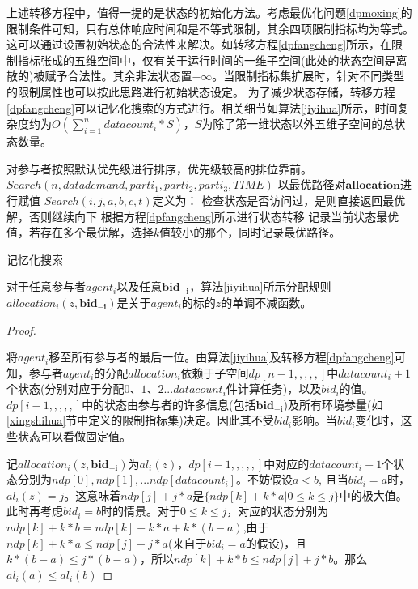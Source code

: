 \documentclass[promaster]{thesis-uestc}
\begin{document}
上述转移方程中，值得一提的是状态的初始化方法。考虑最优化问题\ref{dpmoxing}的限制条件可知，只有总体响应时间和是不等式限制，其余四项限制指标均为等式。这可以通过设置初始状态的合法性来解决。如转移方程\ref{dpfangcheng}所示，在限制指标张成的五维空间中，仅有关于运行时间的一维子空间(此处的状态空间是离散的)被赋予合法性。其余非法状态置$-\infty$。当限制指标集扩展时，针对不同类型的限制属性也可以按此思路进行初始状态设定。
为了减少状态存储，转移方程\ref{dpfangcheng}可以记忆化搜索的方式进行。相关细节如算法\ref{jiyihua}所示，时间复杂度约为$O(\sum_{i=1}^{n}{datacount_i}*S)$，$S$为除了第一维状态以外五维子空间的总状态数量。

\begin{algorithm}[H]
    对参与者按照默认优先级进行排序，优先级较高的排位靠前。
    $Search(n,datademand,parti_1,parti_2,parti_3,TIME)$\;
    以最优路径对$\mathbf{allocation}$进行赋值\;
    \;
    $Search(i,j,a,b,c,t)$定义为：\;
    检查状态是否访问过，是则直接返回最优解，否则继续向下\;
    根据方程\ref{dpfangcheng}所示进行状态转移\;
    记录当前状态最优值，若存在多个最优解，选择$k$值较小的那个，同时记录最优路径。\;
\caption{记忆化搜索}
\label{jiyihua}
\end{algorithm}

\begin{theorem}
对于任意参与者$agent_i$以及任意$\mathbf{bid_{-i}}$，算法\ref{jiyihua}所示分配规则$allocation_i(z,\mathbf{bid_{-i}})$是关于$agent_i$的标的$z$的单调不减函数。
\end{theorem}

\begin{proof}

\label{dpdandiao}

将$agent_i$移至所有参与者的最后一位。由算法\ref{jiyihua}及转移方程\ref{dpfangcheng}可知，参与者$agent_i$的分配$allocation_i$依赖于子空间$dp[n-1,,,,,]$中$datacount_i+1$个状态(分别对应于分配$0、1、2...datacount_i$件计算任务)，以及$bid_i$的值。$dp[i-1,,,,,]$中的状态由参与者的许多信息(包括$\mathbf{bid_{-i}}$)及所有环境参量(如\ref{xingshihua}节中定义的限制指标集)决定。因此其不受$bid_i$影响。当$bid_i$变化时，这些状态可以看做固定值。

记$allocation_i(z,\mathbf{bid_{-i}})$为$al_i(z)$，$dp[i-1,,,,,]$中对应的$datacount_i+1$个状态分别为$ndp[0],ndp[1],...ndp[datacount_i]$。不妨假设$a < b$, 且当$bid_i = a$时，$al_i(z) = j$。这意味着$ndp[j]+j*a$是$\{ndp[k] + k*a|0 \leq k \leq j\}$中的极大值。此时再考虑$bid_i=b$时的情景。对于$ 0\leq k\leq j$，对应的状态分别为$ndp[k]+k*b=ndp[k]+k*a+k*(b-a)$,由于$ndp[k]+k*a\leq ndp[j]+j*a$(来自于$bid_i=a$的假设)，且$k*(b-a)\leq j*(b-a)$，所以$ndp[k]+k*b \leq ndp[j]+j*b$。那么$al_i(a)\leq al_i(b)$
\end{proof}
\end{document}

